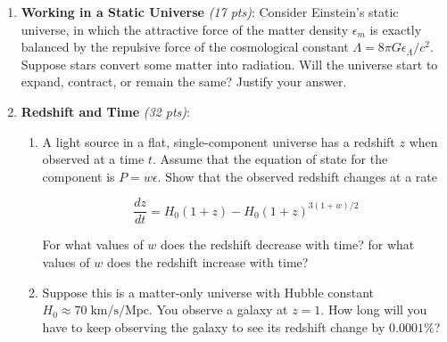\documentclass[12pt,preprint]{aastex}
\begin{document}
\begin{enumerate}
\item \textbf{Working in a Static Universe} \textit{(17 pts)}: Consider Einstein's static universe, in which the attractive force of the matter density $\epsilon_m$ is exactly balanced by the repulsive force of the cosmological constant $\Lambda = 8 \pi G \epsilon_\Lambda/c^2$. Suppose stars convert some matter into radiation. Will the universe start to expand, contract, or remain the same? Justify your answer.

\pagebreak
\item \textbf{Redshift and Time} \textit{(32 pts)}: 
	\begin{enumerate}
	\item A light source in a flat, single-component universe has a redshift $z$ when observed at a time $t$. Assume that the equation of state for the component is $P=w\epsilon$. Show that the observed redshift changes at a rate
	
	$$ \frac{dz}{dt} = H_0(1+z) - H_0(1+z)^{3(1+w)/2} $$
	
	For what values of $w$ does the redshift decrease with time? for what values of $w$ does the redshift increase with time?
	\item Suppose this is a matter-only universe with Hubble constant $H_0 \approx70\; \mathrm{km/s/Mpc}$. You observe a galaxy at $z=1$. How long will you have to keep observing the galaxy to see its redshift change by $0.0001\%$? 
	\end{enumerate}

\end{enumerate}
\end{document}
